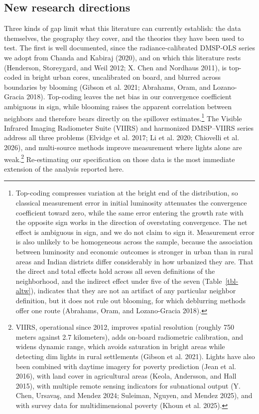 \documentclass[
  letterpaper,
  DIV=11,
  numbers=noendperiod]{scrartcl}
\begin{document}
\subsection{New research directions}\label{new-research-directions}

Three kinds of gap limit what this literature can currently establish:
the data themselves, the geography they cover, and the theories they
have been used to test. The first is well documented, since the
radiance-calibrated DMSP-OLS series we adopt from Chanda and Kabiraj
(2020), and on which this literature rests (Henderson, Storeygard, and
Weil 2012; X. Chen and Nordhaus 2011), is top-coded in bright urban
cores, uncalibrated on board, and blurred across boundaries by blooming
(Gibson et al. 2021; Abrahams, Oram, and Lozano-Gracia 2018). Top-coding
leaves the net bias in our convergence coefficient ambiguous in sign,
while blooming raises the apparent correlation between neighbors and
therefore bears directly on the spillover estimates.\footnote{Top-coding
  compresses variation at the bright end of the distribution, so
  classical measurement error in initial luminosity attenuates the
  convergence coefficient toward zero, while the same error entering the
  growth rate with the opposite sign works in the direction of
  overstating convergence. The net effect is ambiguous in sign, and we
  do not claim to sign it. Measurement error is also unlikely to be
  homogeneous across the sample, because the association between
  luminosity and economic outcomes is stronger in urban than in rural
  areas and Indian districts differ considerably in how urbanized they
  are. That the direct and total effects hold across all seven
  definitions of the neighborhood, and the indirect effect under five of
  the seven (Table~\ref{tbl-altw}), indicates that they are not an
  artifact of any particular neighbor definition, but it does not rule
  out blooming, for which deblurring methods offer one route (Abrahams,
  Oram, and Lozano-Gracia 2018).} The Visible Infrared Imaging
Radiometer Suite (VIIRS) and harmonized DMSP--VIIRS series address all
three problems (Elvidge et al. 2017; Li et al. 2020; Chiovelli et al.
2026), and multi-source methods improve measurement where lights alone
are weak.\footnote{VIIRS, operational since 2012, improves spatial
  resolution (roughly 750 meters against 2.7 kilometers), adds on-board
  radiometric calibration, and widens dynamic range, which avoids
  saturation in bright areas while detecting dim lights in rural
  settlements (Gibson et al. 2021). Lights have also been combined with
  daytime imagery for poverty prediction (Jean et al. 2016), with land
  cover in agricultural areas (Keola, Andersson, and Hall 2015), with
  multiple remote sensing indicators for subnational output (Y. Chen,
  Ursavaş, and Mendez 2024; Suleiman, Nguyen, and Mendez 2025), and with
  survey data for multidimensional poverty (Khoun et al. 2025).}
Re-estimating our specification on those data is the most immediate
extension of the analysis reported here.
\end{document}
